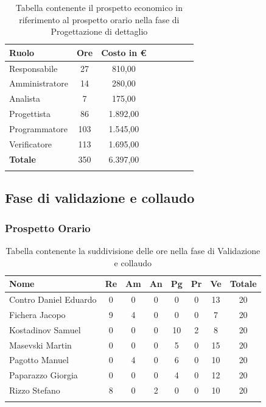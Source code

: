 \documentclass[../piano_di_progetto.tex]{subfiles}
\begin{document}
\begin{center}
	\begin{longtable}{|l|c|c|c|c|c|c|c|}
		\hline
		\rowcolor{lightgray}
		\textbf{Ruolo} & \textbf{Ore} & \textbf{Costo in €}\\

		\hline
		Responsabile & 27 & 810,00\\
		\hline
		Amministratore & 14 & 280,00\\
		\hline
		Analista & 7 & 175,00\\
		\hline
		Progettista & 86 & 1.892,00\\
		\hline
		Programmatore & 103 & 1.545,00\\
		\hline
		Verificatore & 113 & 1.695,00\\
		\hline
		\textbf{Totale} & 350 & 6.397,00\\
		\hline
		\caption{Tabella contenente il prospetto economico in riferimento al prospetto orario nella fase di Progettazione di dettaglio}
	\end{longtable}
\end{center}

\subsection{ Fase di validazione e collaudo}%
\label{sub:fase_valid_collaudo}
\subsubsection{Prospetto Orario}

\begin{center}
	\begin{longtable}{|l|c|c|c|c|c|c|c|}
		\hline
		\rowcolor{lightgray}
		\textbf{Nome} & \textbf{Re} & \textbf{Am} & \textbf{An} & \textbf{Pg}  & \textbf{Pr}   & \textbf{Ve} & \textbf{Totale} \\

		\hline
			Contro Daniel Eduardo & 0 & 0 & 0 & 0 & 0 & 13 & 20\\
		\hline
			Fichera Jacopo & 9 & 4 & 0 & 0 & 0 & 7 & 20 \\ 
		\hline
			Kostadinov Samuel & 0 & 0 & 0 & 10 & 2 & 8 & 20 \\ 		
		\hline
			Masevski Martin & 0 & 0 & 0 & 5 & 0 & 15 & 20 \\
		\hline
			Pagotto Manuel & 0 & 4 & 0 & 6 & 0 & 10 & 20 \\			
		\hline
			Paparazzo Giorgia & 0 & 0 & 0 & 4 & 0 & 12 & 20 \\
		\hline
			Rizzo Stefano & 8 & 0 & 2 & 0 & 0 & 10 & 20 \\
		\hline	

		\caption{Tabella contenente la suddivisione delle ore nella fase di Validazione e collaudo}
	\end{longtable}
\end{center}
\end{document}
